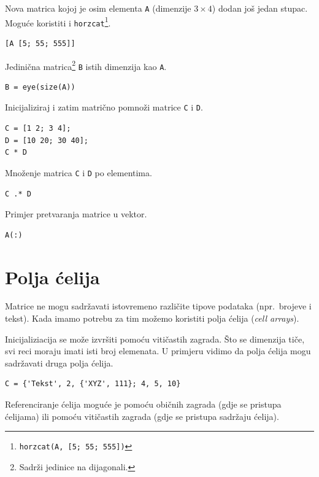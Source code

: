 \documentclass[a4paper, 10pt]{article}
\newcommand{\spec}[1]{\texttt{#1}} %
\newcommand{\eng}[1]{\emph{#1}} %
\begin{document}
Nova matrica kojoj je osim elementa \spec{A} (dimenzije $3 \times 4$) dodan još jedan stupac.
Moguće koristiti i \spec{horzcat}\footnote{\spec{horzcat(A, [5; 55; 555])}}.

\begin{lstlisting}
[A [5; 55; 555]]
\end{lstlisting}

Jedinična matrica\footnote{Sadrži jedinice na dijagonali.} \spec{B} istih dimenzija kao \spec{A}.

\begin{lstlisting}
B = eye(size(A))
\end{lstlisting}

Inicijaliziraj i zatim matrično pomnoži matrice \spec{C} i \spec{D}.

\begin{lstlisting}
C = [1 2; 3 4];
D = [10 20; 30 40];
C * D
\end{lstlisting}

Množenje matrica \spec{C} i \spec{D} po elementima.

\begin{lstlisting}
C .* D
\end{lstlisting}

Primjer pretvaranja matrice u vektor.

\begin{lstlisting}
A(:)
\end{lstlisting}


\section{Polja ćelija}

Matrice ne mogu sadržavati istovremeno različite tipove podataka (npr.\ brojeve i tekst).
Kada imamo potrebu za tim možemo koristiti polja ćelija (\eng{cell arrays}).

Inicijaliziacija se može izvršiti pomoću vitičastih zagrada.
Što se dimenzija tiče, svi reci moraju imati isti broj elemenata.
U primjeru vidimo da polja ćelija mogu sadržavati druga polja ćelija.

\begin{lstlisting}
C = {'Tekst', 2, {'XYZ', 111}; 4, 5, 10}
\end{lstlisting}

Referenciranje ćelija moguće je pomoću običnih zagrada (gdje se pristupa ćelijama) ili pomoću vitičastih zagrada (gdje se pristupa sadržaju ćelija).
\end{document}
